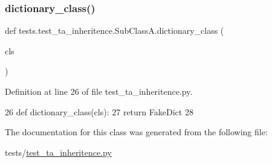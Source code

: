 \subsubsection{\texorpdfstring{dictionary\+\_\+class()}{dictionary\_class()}}
{\footnotesize\ttfamily def tests.\+test\+\_\+ta\+\_\+inheritence.\+Sub\+Class\+A.\+dictionary\+\_\+class (\begin{DoxyParamCaption}\item[{}]{cls }\end{DoxyParamCaption})}



Definition at line 26 of file test\+\_\+ta\+\_\+inheritence.\+py.


\begin{DoxyCode}
26     \textcolor{keyword}{def }dictionary\_class(cls):
27         \textcolor{keywordflow}{return} FakeDict
28 
\end{DoxyCode}


The documentation for this class was generated from the following file\+:\begin{DoxyCompactItemize}
\item 
tests/\hyperlink{test__ta__inheritence_8py}{test\+\_\+ta\+\_\+inheritence.\+py}\end{DoxyCompactItemize}
